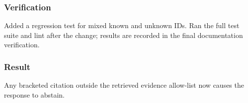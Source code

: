 \subsubsection{Verification}

Added a regression test for mixed known and unknown IDs. Ran the full test suite and lint after the change; results are recorded in the final documentation verification.

\subsubsection{Result}

Any bracketed citation outside the retrieved evidence allow-list now causes the response to abstain.

